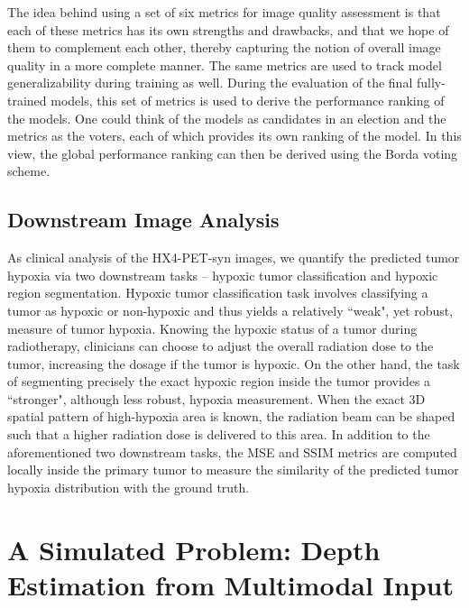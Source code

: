 The idea behind using a set of six metrics for image quality assessment is that each of these metrics has its own strengths and drawbacks, and that we hope of them to complement each other, thereby capturing the notion of overall image quality in a more complete manner. The same metrics are used to track model generalizability during training as well. During the evaluation of the final fully-trained models, this set of metrics is used to derive the performance ranking of the models. One could think of the models as candidates in an election and the metrics as the voters, each of which provides its own ranking of the model. In this view, the global performance ranking can then be derived using the Borda voting scheme.


\subsection{Downstream Image Analysis}
As clinical analysis of the HX4-PET-syn images, we quantify the predicted tumor hypoxia via two downstream tasks -- hypoxic tumor classification and hypoxic region segmentation. Hypoxic tumor classification task involves classifying a tumor as hypoxic or non-hypoxic and thus yields a relatively ``weak", yet robust, measure of tumor hypoxia. Knowing the hypoxic status of a tumor during radiotherapy, clinicians can choose to adjust the overall radiation dose to the tumor, increasing the dosage if the tumor is hypoxic. On the other hand, the task of segmenting precisely the exact hypoxic region inside the tumor provides a ``stronger", although less robust, hypoxia measurement. When the exact 3D spatial pattern of high-hypoxia area is known, the radiation beam can be shaped such that a higher radiation dose is delivered to this area. In addition to the aforementioned two downstream tasks, the MSE and SSIM metrics are computed locally inside the primary tumor to measure the similarity of the predicted tumor hypoxia distribution with the ground truth. 



\section{A Simulated Problem: Depth Estimation from Multimodal Input}
\label{ClearGrasp_Depth_Estimation}

